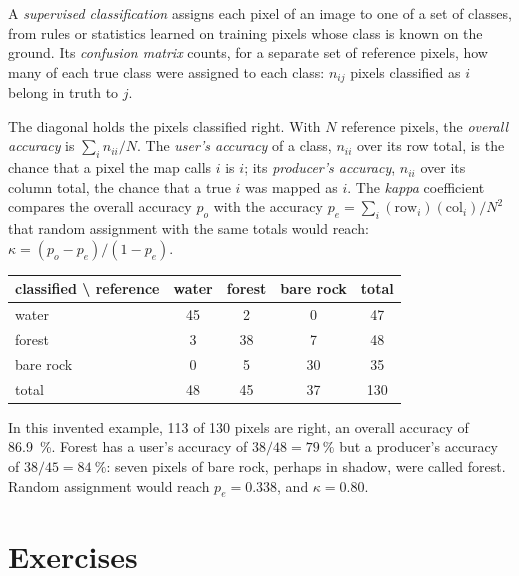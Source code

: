 \begin{definition}\label{def:b3:remote-sensing-gis:classification}
A \emph{supervised classification}
assigns each pixel of an image to one of a set of classes, from rules or
statistics learned on training pixels whose class is known on the ground.
Its \emph{confusion matrix} counts, for a separate
set of reference pixels, how many of each true class were assigned to each
class: $n_{ij}$ pixels classified as $i$ belong in truth to $j$.
\end{definition}

The diagonal holds the pixels classified right. With $N$ reference pixels,
the \emph{overall accuracy} is $\sum_i n_{ii}/N$. The \emph{user's
accuracy} of a class, $n_{ii}$ over its row total, is the chance that a
pixel the map calls $i$ is $i$; its \emph{producer's accuracy}, $n_{ii}$
over its column total, the chance that a true $i$ was mapped as $i$. The
\emph{kappa} coefficient compares the overall accuracy $p_o$ with the
accuracy $p_e = \sum_i (\text{row}_i)(\text{col}_i)/N^2$ that random
assignment with the same totals would reach: $\kappa = (p_o - p_e)/(1 -
p_e)$.

\begin{center}
\small
\begin{tabular}{l|ccc|c}
\hline
classified \textbackslash{} reference & water & forest & bare rock & total \\
\hline
water & 45 & 2 & 0 & 47 \\
forest & 3 & 38 & 7 & 48 \\
bare rock & 0 & 5 & 30 & 35 \\
\hline
total & 48 & 45 & 37 & 130 \\
\hline
\end{tabular}
\end{center}

In this invented example, 113 of 130 pixels are right, an overall accuracy
of \qty{86.9}{\percent}. Forest has a user's accuracy of
$38/48 = \qty{79}{\percent}$ but a producer's accuracy of $38/45 =
\qty{84}{\percent}$: seven pixels of bare rock, perhaps in shadow, were
called forest. Random assignment would reach $p_e = 0.338$, and $\kappa =
0.80$.

\section{Exercises}

